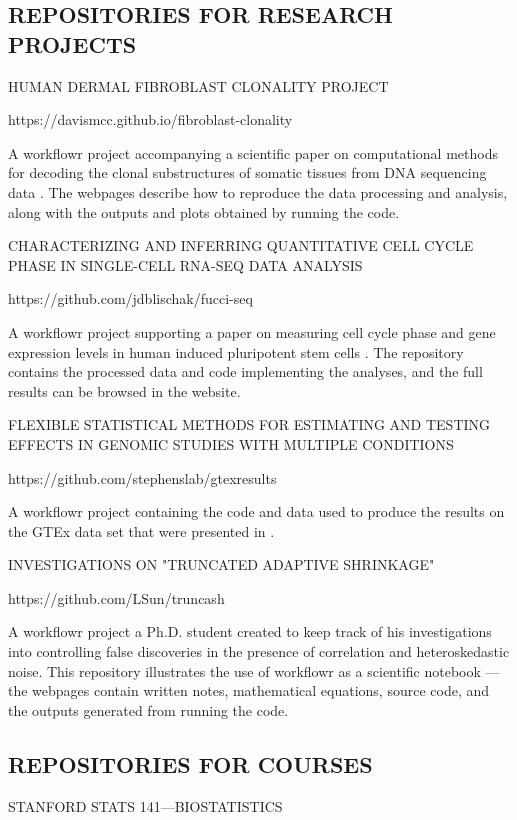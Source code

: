 \documentclass[9pt,a4paper]{extarticle}
\begin{document}
\subsection*{REPOSITORIES FOR RESEARCH PROJECTS}

HUMAN DERMAL FIBROBLAST CLONALITY PROJECT

https://davismcc.github.io/fibroblast-clonality

A workflowr project accompanying a scientific paper on computational
methods for decoding the clonal substructures of somatic tissues from
DNA sequencing data \cite{McCarthy2018}. The webpages describe how to
reproduce the data processing and analysis, along with the outputs and
plots obtained by running the code.

CHARACTERIZING AND INFERRING QUANTITATIVE CELL CYCLE PHASE IN
SINGLE-CELL RNA-SEQ DATA ANALYSIS

https://github.com/jdblischak/fucci-seq

A workflowr project supporting a paper on measuring cell cycle phase and
gene expression levels in human induced pluripotent stem cells
\cite{Hsiao2019}. The repository contains the processed data and code
implementing the analyses, and the full results can be browsed in the
website.

FLEXIBLE STATISTICAL METHODS FOR ESTIMATING AND TESTING EFFECTS IN
GENOMIC STUDIES WITH MULTIPLE CONDITIONS

https://github.com/stephenslab/gtexresults

A workflowr project containing the code and data used to produce the
results on the GTEx data set that were presented in \cite{Urbut2018}.

INVESTIGATIONS ON "TRUNCATED ADAPTIVE SHRINKAGE"

https://github.com/LSun/truncash

A workflowr project a Ph.D. student created to keep track of his
investigations into controlling false discoveries in the presence of
correlation and heteroskedastic noise. This repository illustrates the
use of workflowr as a scientific notebook --- the webpages contain
written notes, mathematical equations, source code, and the outputs
generated from running the code.

\subsection*{REPOSITORIES FOR COURSES}

STANFORD STATS 141—BIOSTATISTICS
\end{document}
